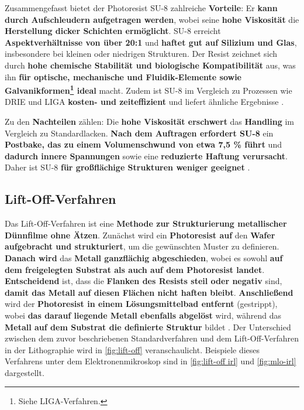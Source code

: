 \documentclass{article} %
\begin{document}
Zusammengefasst bietet der Photoresist SU-8 zahlreiche \textbf{Vorteile}: Er \textbf{kann durch Aufschleudern aufgetragen werden}, wobei seine \textbf{hohe Viskosität} die \textbf{Herstellung dicker Schichten ermöglicht}. SU-8 erreicht \textbf{Aspektverhältnisse von über 20:1} und \textbf{haftet gut auf Silizium und Glas}, insbesondere bei kleinen oder niedrigen Strukturen. Der Resist zeichnet sich durch \textbf{hohe chemische Stabilität und biologische Kompatibilität} aus, was ihn \textbf{für optische, mechanische und Fluidik-Elemente sowie Galvanikformen\footnote{Siehe LIGA-Verfahren.} ideal} macht. Zudem ist SU-8 im Vergleich zu Prozessen wie DRIE und LIGA \textbf{kosten- und zeiteffizient} und liefert ähnliche Ergebnisse \cite{schmid2024, Kayaku2020}.

\vspace{1em}

Zu den \textbf{Nachteilen} zählen: Die \textbf{hohe Viskosität erschwert} das \textbf{Handling} im Vergleich zu Standardlacken. \textbf{Nach dem Auftragen erfordert SU-8} ein \textbf{Postbake, das zu einem Volumenschwund von etwa 7,5 \% führt} und \textbf{dadurch innere Spannungen} sowie eine \textbf{reduzierte Haftung verursacht}. Daher ist SU-8 \textbf{für großflächige Strukturen weniger geeignet} \cite{schmid2024, Kayaku2020}.





\vspace{1em}

\subsection{Lift-Off-Verfahren}

Das Lift-Off-Verfahren ist eine \textbf{Methode zur Strukturierung metallischer Dünnfilme ohne Ätzen}. Zunächst wird ein \textbf{Photoresist auf} den \textbf{Wafer aufgebracht und strukturiert}, um die gewünschten Muster zu definieren. \textbf{Danach wird} das \textbf{Metall ganzflächig abgeschieden}, wobei es sowohl \textbf{auf dem freigelegten Substrat als auch auf dem Photoresist landet}. \textbf{Entscheidend} ist, dass die \textbf{Flanken des Resists steil oder negativ} sind, \textbf{damit das Metall auf diesen Flächen nicht haften bleibt}. \textbf{Anschließend} wird der \textbf{Photoresist in einem Lösungsmittelbad entfernt} (gestrippt), wobei \textbf{das darauf liegende Metall ebenfalls abgelöst} wird, während das \textbf{Metall auf dem Substrat die definierte Struktur} bildet \cite{madou2002, smith1997, kern1990}. Der Unterschied zwischen dem zuvor beschriebenen Standardverfahren und dem Lift-Off-Verfahren in der Lithographie wird in \autoref{fig:lift-off} veranschaulicht. Beispiele dieses Verfahrens unter dem Elektronenmikroskop sind in \autoref{fig:lift-off irl} und \autoref{fig:mlo-irl} dargestellt.
\end{document}
